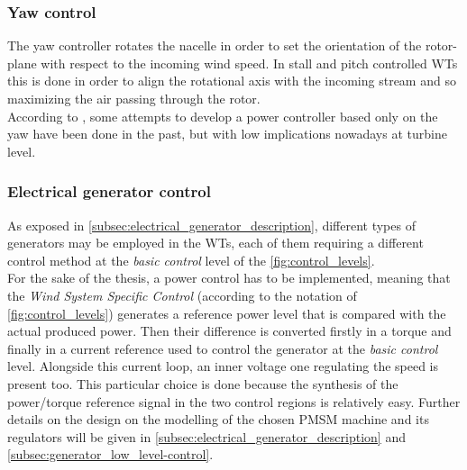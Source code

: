 \subsubsection{Yaw control}
The yaw controller rotates the nacelle in order to set the orientation of the rotor-plane with respect to the incoming wind speed. In stall and pitch controlled \acrshort{WTs} this is done in order to align the rotational axis with the incoming stream and so maximizing the air passing through the rotor. \\
According to \cite{Aerodynamics_of_wind_turbines}, some attempts to develop a power controller based only on the yaw have been done in the past, but with low implications nowadays at turbine level. 

\subsubsection{Electrical generator control}
As exposed in \autoref{subsec:electrical_generator_description}, different types of generators may be employed in the WTs, each of them requiring a different control method at the \textit{basic control} level of the \autoref{fig:control_levels}. \\
For the sake of the thesis, a power control has to be implemented, meaning that the \textit{Wind System Specific Control} (according to the notation of \autoref{fig:control_levels}) generates a reference power level that is compared with the actual produced power. Then their difference is converted firstly in a torque and finally in a current reference used to control the generator at the \textit{basic control} level. Alongside this current loop, an inner voltage one regulating the speed is present too. This particular choice is done because the synthesis of the power/torque reference signal in the two control regions is relatively easy. Further details on the design on the modelling of the chosen PMSM machine and its regulators will be given in \autoref{subsec:electrical_generator_description} and \autoref{subsec:generator_low_level-control}.